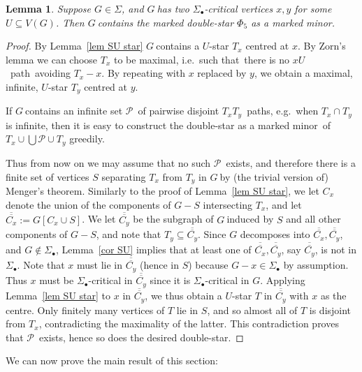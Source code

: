 \documentclass{article}
\newcommand{\SU}{\ensuremath{\Sig_\bullet}}
\newcommand{\dbar}[1]{\ensuremath{\overline{\overline{#1}}}}
\newcommand{\mm}{marked minor}
\newcommand{\Sig}{\ensuremath{\Sigma}}
\newtheorem{lemma}[proposition]{Lemma}
\newcommand{\cp}{\ensuremath{\mathcal P}}
\newcommand{\pth}[2]{\ensuremath{#1}\text{--}\ensuremath{#2}~path}
\newcommand{\pths}[2]{\ensuremath{#1}\text{--}\ensuremath{#2}~paths}
\newcommand{\g}{\ensuremath{G\ }}
\newcommand{\G}{\ensuremath{G}}
\newcommand{\Lr}[1]{Lemma~\ref{#1}}
\newcommand{\st}{such that}
\begin{document}
\begin{lemma} \label{lem SU dstar}
Suppose $G \in \Sig$, and \g has two \SU-critical vertices $x,y$ for some $U\subseteq V(G)$. Then \g contains  the marked double-star $\Phi_5$ as a \mm. \end{lemma}
\begin{proof}
By \Lr{lem SU star} \g contains a $U$-star $T_x$ centred at $x$. By Zorn's lemma we can choose $T_x$ to be maximal, i.e.\ \st\ there is no \pth{x}{U}\  avoiding $T_x-x$. By repeating with $x$ replaced by $y$, we obtain a maximal,  infinite,  $U$-star $T_y$ centred at $y$. 

If \g contains an infinite set \cp\ of pairwise disjoint \pths{T_x}{T_y}, e.g.\ when $T_x \cap T_y$ is infinite, then it is easy to construct the double-star as a \mm\ of $T_x \cup \bigcup \cp \cup T_y$ greedily.

Thus from now on we may assume that no such \cp\ exists, and therefore there is a finite set of vertices $S$ separating $T_x$ from $T_y$ in \g by (the trivial version of) Menger's theorem. Similarly to the proof of \Lr{lem SU star}, we let $C_x$ denote the union of the components of $G -S$ intersecting $T_x$, and let $\dbar{C_x}:= G[C_x \cup S]$. We let $\dbar{C_y}$ be the subgraph of \g induced by $S$ and all other components of $G -S$, and note that $T_y\subseteq \dbar{C_y}$. Since $G$ decomposes into  $ \dbar{C_x}, \dbar{C_y}$, and $G\not\in \SU$, \Lr{cor SU} implies that at least one of $\dbar{C_x} ,\dbar{C_y}$, say $\dbar{C_y}$, is not in \SU. Note that $x$ must lie in $\dbar{C_y}$ (hence in $S$) because $G-x\in \SU$ by assumption. Thus $x$ must be \SU-critical in $\dbar{C_y}$ since it is \SU-critical in \G. Applying \Lr{lem SU star} to $x$ in $\dbar{C_y}$, we thus obtain a $U$-star $T$ in $\dbar{C_y}$ with $x$ as the centre. Only finitely many vertices of $T$ lie in $S$, and so almost all of $T$ is disjoint from $T_x$, contradicting the maximality of the latter. This contradiction proves that \cp\ exists, hence so does the desired double-star.
\end{proof}

We can now prove the main result of this section:
\end{document}
